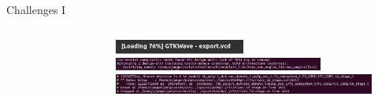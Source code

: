 \documentclass[aspectratio=169, nobackgroundmain]{beamer}
\begin{document}
\begin{frame}[fragile]{Challenges I}
  \begin{columns}
    \begin{column}{0.22\textwidth}
      \begin{figure}
        \centering
        \includegraphics[width=\textwidth]{vpn.jpeg}
      \end{figure}
    \end{column}
    \begin{column}{0.78\textwidth}
      \begin{figure}
        \centering
        \includegraphics[width=0.5\textwidth]{loading.png}
        \includegraphics[width=0.8\textwidth]{modules.png}
        \includegraphics[width=1\textwidth]{branch-x.png}
      \end{figure}
    \end{column}
  \end{columns}
\end{frame}
\end{document}
